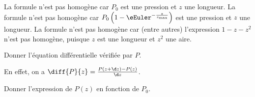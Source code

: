 \reponse{\reponseC{}}

\begin{corrige}
La formule \reponseA{} n'est pas homogène car $P_0$ est une pression et $z$ une longueur. 
La formule \reponseB{} n'est pas homogène car $P_0\left (1-\eEuler^{-\frac{z}{z_{\text{max}}}}\right )$ est une pression et $z$ une longueur. 
La formule \reponseD{} n'est pas homogène car (entre autres) l'expression $1-z-z^2$ n'est pas homogène, puisque $z$ est une longueur et $z^2$ une aire.
\end{corrige}





\begin{enonce}
Donner l'équation différentielle vérifiée par $P$.
\end{enonce}


\begin{corrige}
En effet, on a $\diff{P}{z} = \frac{P(z+\d z)-P(z)}{\d z}$.
\end{corrige}





\begin{enonce}
Donner l'expression de $P(z)$ en fonction de $P_0$.
\end{enonce}






\finEntrainement








